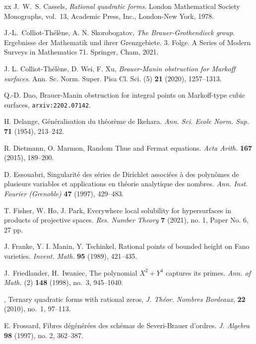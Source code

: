 \documentclass[a4paper,12pt,reqno]{amsart}
\numberwithin{equation}{section} \numberwithin{figure}{section}
\renewcommand{\#}{\sharp}
\theoremstyle{definition}
\numberwithin{lemma}{section}
\begin{document}
\begin{thebibliography}{xx}
J.~W.~S. Cassels, \emph{Rational quadratic forms}. London Mathematical Society
  Monographs, vol.~13, Academic Press, Inc., London-New York, 1978.

J.-L.~Colliot-Thélène, A. N. Skorobogatov, 
\emph{The Brauer-Grothendieck group}. 
Ergebnisse der Mathematik und ihrer Grenzgebiete. 3. Folge. A Series of Modern Surveys in Mathematics 71. Springer, Cham, 2021.

J. L. Colliot-Th\'{e}l\`ene, D. Wei, F. Xu, \emph{Brauer-{M}anin obstruction for {M}arkoff surfaces}. 
Ann. Sc. Norm. Super. Pisa Cl. Sci. (5) \textbf{21} (2020), 1257--1313.
  
{Q.-D. Dao},
Brauer-Manin obstruction for integral points on Markoff-type cubic surfaces,
\texttt{arxiv:2202.07142}. 

H. Delange,
{Généralisation du théorème de Ikehara}.
\emph{Ann. Sci. Ecole Norm. Sup.} {\bf 71} (1954), 213--242.

{R. Dietmann, O. Marmon}, 
{Random {T}hue and {F}ermat equations}.
\textit{Acta Arith.} \textbf{167} (2015), 189--200.
 
D. Essouabri,
{Singularit\'{e} des s\'{e}ries de {D}irichlet associ\'{e}es \`a des
              polyn\^{o}mes de plusieurs variables et applications en th\'{e}orie
              analytique des nombres}.
\emph{Ann. Inst. Fourier (Grenoble)} {\bf 47} (1997), 429--483.

T. Fisher, W. Ho, J. Park, 
Everywhere local solubility for hypersurfaces in products of projective spaces. 
\emph{Res. Number Theory} {\bf7} (2021), no. 1, Paper No. 6, 27 pp.

J. Franke, Y. I. Manin, Y. Tschinkel, 
{Rational points of bounded height on Fano varieties}.
\emph{Invent. Math.} {\bf 95} (1989), 421--435.

J.~Friedlander, H.~Iwaniec,
The polynomial {$X^2+Y^4$} captures its  primes. \emph{Ann. of Math.} (2) \textbf{148} (1998), no.~3, 945--1040.

\bysame, Ternary quadratic forms with rational zeros, 
\emph{J. Th\'{e}or.  Nombres Bordeaux}, \textbf{22} (2010), no.~1, 97--113.

E. Frossard, 
{Fibres d\'{e}g\'{e}n\'{e}r\'{e}es des sch\'{e}mas de Severi-Brauer d'ordres}.
\emph{J. Algebra} {\bf 98} (1997), no. 2, 362--387.
 

\end{thebibliography}
\end{document}
